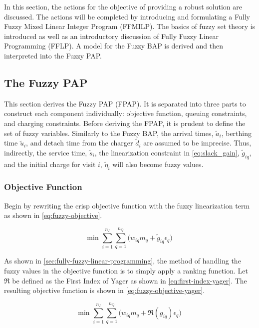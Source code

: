 \documentclass[ee,msthesis]{usuthesis}
\begin{document}
In this section, the actions for the objective of providing a robust solution are discussed. The actions will be
completed by introducing and formulating a Fully Fuzzy Mixed Linear Integer Program (FFMILP). The basics of fuzzy set
theory is introduced as well as an introductory discussion of Fully Fuzzy Linear Programming (FFLP). A model for the
Fuzzy BAP is derived and then interpreted into the Fuzzy PAP.

\subsection{The Fuzzy PAP}
\label{sec:the-fuzzy-pap}
This section derives the Fuzzy PAP (FPAP). It is separated into three parts to construct each component individually:
objective function, queuing constraints, and charging constraints. Before deriving the FPAP, it is prudent to define the
set of fuzzy variables. Similarly to the Fuzzy BAP, the arrival times, \(\tilde{a}_i\), berthing time \(\tilde{u}_i\), and
detach time from the charger \(\tilde{d}_i\) are assumed to be imprecise. Thus, indirectly, the service time,
\(\tilde{s}_i\), the linearization constraint in \ref{eq:slack_gain}, \(\tilde{g}_{iq}\), and the initial charge for visit
\(i\), \(\tilde{\eta}_i\) will also become fuzzy values.

\subsubsection{Objective Function}
\label{sec:orge5c29e9}
Begin by rewriting the crisp objective function with the fuzzy linearization term as shown in \ref{eq:fuzzy-objective}.

\begin{equation}
\label{eq:fuzzy-objective}
\text{min } \sum_{i=1}^{n_I} \sum_{q=1}^{n_Q} \Big( w_{iq} m_q + \tilde{g}_{iq} \epsilon_{q} \Big)
\end{equation}

As shown in \ref{sec:fully-fuzzy-linear-programming}, the method of handling the fuzzy values in the objective function is to
simply apply a ranking function. Let \(\mathfrak{R}\) be defined as the First Index of Yager as shown in \ref{eq:first-index-yager}.
The resulting objective function is shown in \ref{eq:fuzzy-objective-yager}.

\begin{equation}
\label{eq:fuzzy-objective-yager}
\text{min } \sum_{i=1}^{n_I} \sum_{q=1}^{n_Q} \Big( w_{iq} m_q + \mathfrak{R}(g_{iq}) \epsilon_{q} \Big)
\end{equation}
\end{document}
